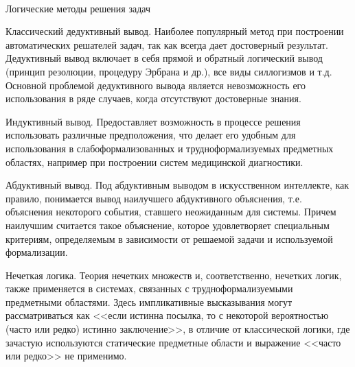 \begin{frame}{\\Логические методы решения задач}
\topline
\justifying
\vspace{10mm}
     
    \begin{textitemize}
        \item Классический дедуктивный вывод. Наиболее популярный метод при построении автоматических решателей задач, так как всегда дает достоверный результат. Дедуктивный вывод включает в себя прямой и обратный логический вывод (принцип резолюции, процедуру Эрбрана и др.), все виды силлогизмов и т.д. Основной проблемой дедуктивного вывода является невозможность его использования в ряде случаев, когда отсутствуют достоверные знания.
        \item Индуктивный вывод. Предоставляет возможность в процессе решения использовать различные предположения, что делает его удобным для использования в слабоформализованных и трудноформализуемых предметных областях, например при построении систем медицинской диагностики.
    \end{textitemize}
\end{frame}

\begin{frame}{}
\topline
\justifying
\vspace{10mm}

    \begin{textitemize}
        \item  Абдуктивный вывод. Под абдуктивным выводом в искусственном интеллекте, как правило, понимается вывод наилучшего абдуктивного объяснения, т.е. объяснения некоторого события, ставшего неожиданным для системы. Причем наилучшим считается такое объяснение, которое удовлетворяет специальным критериям, определяемым в зависимости от решаемой задачи и используемой формализации.
        \item Нечеткая логика. Теория нечетких множеств и, соответственно, нечетких логик, также применяется в системах, связанных с трудноформализуемыми предметными областями. Здесь импликативные высказывания могут рассматриваться как <<если истинна посылка, то с некоторой вероятностью (часто или редко) истинно заключение>>, в отличие от классической логики, где зачастую используются статические предметные области и выражение <<часто или редко>> не применимо. 
    \end{textitemize}
\end{frame}

